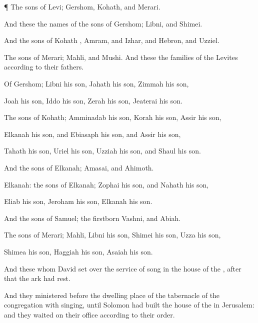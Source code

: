 {\par }{\PP {}¶ The
sons of
Levi;
Gershom,
Kohath, and
Merari.

And these
{} the
names of the
sons of
Gershom;
Libni, and
Shimei.

And the
sons of
Kohath
{},
Amram, and
Izhar, and
Hebron, and
Uzziel.

The
sons of
Merari;
Mahli, and
Mushi. And these
{} the
families of the
Levites according to their
fathers.

Of
Gershom;
Libni his
son,
Jahath his
son,
Zimmah his
son,

Joah his
son,
Iddo his
son,
Zerah his
son,
Jeaterai his
son.

The
sons of
Kohath;
Amminadab his
son,
Korah his
son,
Assir his
son,

Elkanah his
son, and
Ebiasaph his
son, and
Assir his
son,

Tahath his
son,
Uriel his
son,
Uzziah his
son, and
Shaul his
son.

And the
sons of
Elkanah;
Amasai, and
Ahimoth.

Elkanah: the
sons of
Elkanah;
Zophai his
son, and
Nahath his
son,

Eliab his
son,
Jeroham his
son,
Elkanah his
son.

And the
sons of
Samuel; the
firstborn
Vashni, and
Abiah.

The
sons of
Merari;
Mahli,
Libni his
son,
Shimei his
son,
Uzza his
son,

Shimea his
son,
Haggiah his
son,
Asaiah his
son.


\par }{\PP {}And these
{} whom
David
set over the
service of
song in the
house of the
{}, after that the
ark had
rest.

And they
ministered
before the
dwelling place of the
tabernacle of the
congregation with
singing, until
Solomon had
built the
house of the
{} in
Jerusalem: and
{} they
waited on their
office according to their
order.

}

